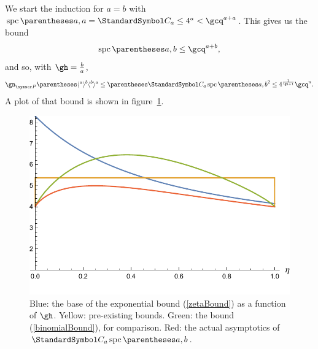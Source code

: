 We start the induction for $a=b$ with $\spc\of{a,a}=\CatalanNumber a \leq 4^{a} < \gcq^{a+a}$.
This gives us the bound\[
\spc\of{a,b}\leq\gcq^{a+b}\text,
\]
and so, with $\gh=\frac{b}{a}$,\begin{equation}
\gn_{\pointset P}\of{\langle^a\rangle^b\langle^b\rangle^a} \leq \pa{\CatalanNumber a \spc\of{a,b}}^2\leq 4^{\frac{1}{\gh+1}} \gcq^{n}\text.
\label{zetaBound}
\end{equation}
A plot of that bound is shown in figure~\ref{figZetaBound}.

\begin{figure}[htb!]
\includegraphics[scale=0.75]{spc-zeta-bound.pdf}
\caption{Blue: the base of the exponential bound (\ref{zetaBound}) as a function of $\gh$. Yellow: pre-existing bounds.
Green: the bound (\ref{binomialBound}), for comparison. Red: the actual asymptotics of $\CatalanNumber a \spc\of{a,b}$.\label{figZetaBound}}
\end{figure}